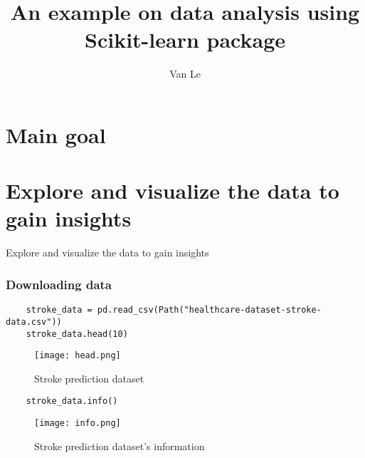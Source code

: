 \documentclass[10pt]{beamer}
\author[nle12@vols.utk.edu]{Van Le }
\institute[UTK] %
{
		Department of Mathematics\\
	The University of Tennessee, Knoxville\\

}
\theoremstyle{definition}
\theoremstyle{remark}
\numberwithin{equation}{section}
\begin{document}
	\title[Introduction to machine learning]{An example on data analysis using Scikit-learn package}
	\frame{\titlepage}
	\frame
	{
			\tableofcontents
	}


\section{Main goal}

\section{Explore and visualize the data to gain insights}
\begin{frame}
	\centering Explore and visualize the data to gain insights
\end{frame}

\begin{frame}[fragile]
	\frametitle{Downloading data}
\begin{lstlisting}
	stroke_data = pd.read_csv(Path("healthcare-dataset-stroke-data.csv")) 
	stroke_data.head(10)
\end{lstlisting}

\begin{figure}[h]
	\caption{Stroke prediction dataset}
	\centering
	\texttt{[image: head.png]}
\end{figure}

\end{frame}



\begin{frame}[fragile]
\begin{lstlisting}
	stroke_data.info()
\end{lstlisting}
	
	\begin{figure}[h]
		\caption{Stroke prediction dataset's information}
		\centering
		\texttt{[image: info.png]}
	\end{figure}
	
\end{frame}
\end{document}
